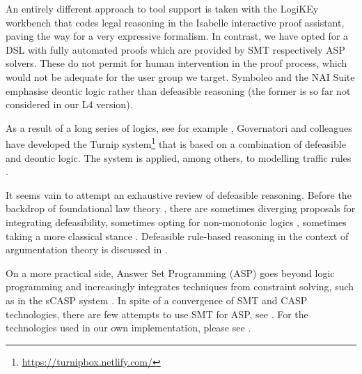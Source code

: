 An entirely different approach to tool support is taken with the LogiKEy \cite{benzmueller_etal_logikey_2020}
workbench that codes legal reasoning in the Isabelle interactive proof assistant, paving
the way for a very expressive formalism. In contrast, we have opted for a DSL
with fully automated proofs which are provided by SMT respectively ASP solvers. These do not permit for human intervention in the proof process, which would not be adequate for the user group we target. Symboleo
\cite{sarifi_parvizimosaed_amyot_logrippo_mylopoulos_Symboleo_spec_legal_contracts_2020}
and the NAI Suite
\cite{libal_steen_nai_suite_draft_reason_legal_texts_jurix_2019} emphasise
deontic logic rather than defeasible reasoning (the former is so far not
considered in our L4 version).

As a result of a long series of logics, see for example
\cite{governatori_carnead_defeas_logic_icail_2011,governatori21:_unrav_legal_refer_defeas_deont_logic},
Governatori and colleagues have developed the Turnip
system\footnote{\url{https://turnipbox.netlify.com/}} that is based on a
combination of defeasible and deontic logic. The system is applied, among
others, to modelling traffic rules
\cite{governatori_Traffic_Rules_Encoding_using_Defeasible_jurix_2020}.

It seems vain to attempt an exhaustive
review of defeasible reasoning. Before the backdrop of foundational law
theory \cite{hart_concept_of_law_1997}, there are sometimes diverging
proposals for integrating defeasibility, sometimes opting for non-monotonic
logics \cite{hage_law_and_defeasibility_2003}, sometimes taking a more
classical stance \cite{alchourron_makinson_hierarchies_of_regulations_1981}. 
Defeasible rule-based reasoning in the context of argumentation theory is
discussed in \cite{dung_argumentation_theory_1995,amgoud_besnard_rule_based_argumentation_systems_2019}.

On a more practical side, Answer Set Programming (ASP) \cite{asp_background}
goes beyond logic programming and increasingly integrates techniques from
constraint solving, such as in the sCASP system
\cite{arias_phd_2019}. In spite of a convergence of SMT and CASP technologies,
there are few attempts to use SMT for ASP, see
\cite{shen_lierler_smt_answer_set_kr_2018}. For the technologies used in our
own implementation, please see . 




